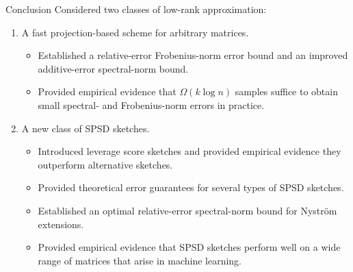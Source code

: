 \documentclass[xcolor=x11names,compress,ignorenonframetext]{beamer}
\renewcommand{\(}{\begin{columns}}
\renewcommand{\)}{\end{columns}}
\newcommand{\<}[1]{\begin{column}{#1}}
\renewcommand{\>}{\end{column}}
\def\refcolor{DodgerBlue4}
\newcommand{\refer}[1]{({\color{\refcolor}#1})}
\begin{document}
% 


 \begin{frame}{Conclusion}
  Considered two classes of low-rank approximation:
  \begin{enumerate}
   \item A fast projection-based scheme for arbitrary matrices.
    \begin{itemize}
     \item Established a relative-error Frobenius-norm error bound and an improved
  additive-error spectral-norm bound.
      \item Provided empirical evidence that $\Omega(k \log n)$ samples suffice to 
      obtain small spectral- and Frobenius-norm errors in practice.
    \end{itemize}

   \item A new class of SPSD sketches.
   \begin{itemize}
    \item Introduced leverage score sketches and provided empirical evidence they
     outperform alternative sketches.
     \item Provided theoretical error guarantees for several types of SPSD sketches.
     \item Established an optimal relative-error spectral-norm bound for Nystr\"om extensions.
     \item Provided empirical evidence that SPSD sketches perform well on a wide range of matrices
     that arise in machine learning.
    \end{itemize}
  \end{enumerate}

  
 \end{frame}

%  
% 
\end{document}
